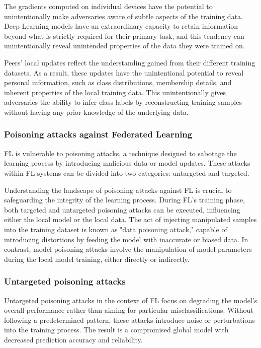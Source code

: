 The gradients computed on individual devices have the potential to unintentionally make adversaries aware of subtle aspects of the training data. Deep Learning models have an extraordinary capacity to retain information beyond what is strictly required for their primary task, and this tendency can unintentionally reveal unintended properties of the data they were trained on.

Peers' local updates reflect the understanding gained from their different training datasets. As a result, these updates have the unintentional potential to reveal personal information, such as class distributions, membership details, and inherent properties of the local training data. This unintentionally gives adversaries the ability to infer class labels by reconstructing training samples without having any prior knowledge of the underlying data.

\subsubsection{Poisoning attacks against Federated Learning}
FL is vulnerable to poisoning attacks, a technique designed to sabotage the learning process by introducing malicious data or model updates. These attacks within FL systems can be divided into two categories: untargeted and targeted.

Understanding the landscape of poisoning attacks against FL is crucial to safeguarding the integrity of the learning process. During FL's training phase, both targeted and untargeted poisoning attacks can be executed, influencing either the local model or the local data. The act of injecting manipulated samples into the training dataset is known as "data poisoning attack," capable of introducing distortions by feeding the model with inaccurate or biased data. In contrast, model poisoning attacks involve the manipulation of model parameters during the local model training, either directly or indirectly.

\subsubsection{Untargeted poisoning attacks}\label{sec:untargeted}
Untargeted poisoning attacks in the context of FL focus on degrading the model's overall performance rather than aiming for particular misclassifications. Without following a predetermined pattern, these attacks introduce noise or perturbations into the training process. The result is a compromised global model with decreased prediction accuracy and reliability.

